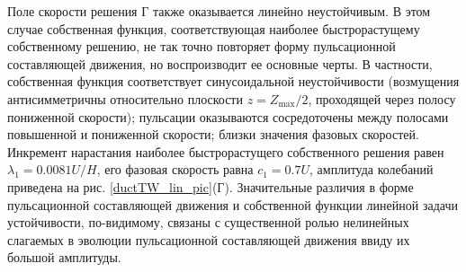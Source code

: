 Поле скорости решения Г также оказывается линейно неустойчивым. В этом случае собственная функция, соответствующая наиболее быстрорастущему собственному решению, не так точно повторяет форму пульсационной составляющей движения, но воспроизводит ее основные черты. В частности, собственная функция соответствует синусоидальной неустойчивости (возмущения антисимметричны относительно плоскости $z = Z_\mathrm{max} / 2$, проходящей через полосу пониженной скорости); пульсации оказываются сосредоточены между полосами повышенной и пониженной скорости; близки значения фазовых скоростей. Инкремент нарастания наиболее быстрорастущего собственного решения равен $\lambda_1 = 0.0081U/H$, его фазовая скорость равна $c_1 = 0.7U$, амплитуда колебаний приведена на рис. \ref{ductTW_lin_pic}(Г). Значительные различия в форме пульсационной составляющей движения и собственной функции линейной задачи устойчивости, по-видимому, связаны с существенной ролью нелинейных слагаемых в эволюции пульсационной составляющей движения ввиду их большой амплитуды. 

